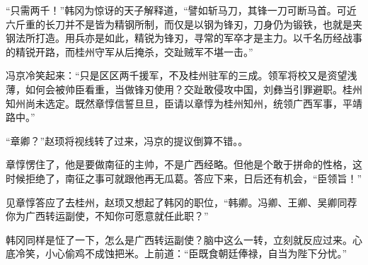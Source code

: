 “只需两千！”韩冈为惊讶的天子解释道，“譬如斩马刀，其锋一刀可断马首。可近六斤重的长刀并不是皆为精钢所制，而仅是以钢为锋刃，刀身仍为锻铁，也就是夹钢法所打造。用兵亦是如此，精锐为锋刃，寻常的军卒才是主力。以千名历经战事的精锐开路，而桂州守军从后掩杀，交趾贼军不堪一击。”

冯京冷笑起来：“只是区区两千援军，不及桂州驻军的三成。领军将校又是资望浅薄，如何会被帅臣看重，当做锋刃使用？交趾敢侵攻中国，刘彝当引罪避职。桂州知州尚未选定。既然章惇信誓旦旦，臣请以章惇为桂州知州，统领广西军事，平靖路中。”

“章卿？”赵顼将视线转了过来，冯京的提议倒算不错。。

章惇愣住了，他是要做南征的主帅，不是广西经略。但他是个敢于拼命的性格，这时候拒绝了，南征之事可就跟他再无瓜葛。答应下来，日后还有机会，“臣领旨！”

见章惇答应了去桂州，赵顼又想起了韩冈的职位，“韩卿。冯卿、王卿、吴卿同荐你为广西转运副使，不知你可愿意就任此职？”

韩冈同样是怔了一下，怎么是广西转运副使？脑中这么一转，立刻就反应过来。心底冷笑，小心偷鸡不成蚀把米。上前道：“臣既食朝廷俸禄，自当为陛下分忧。”

